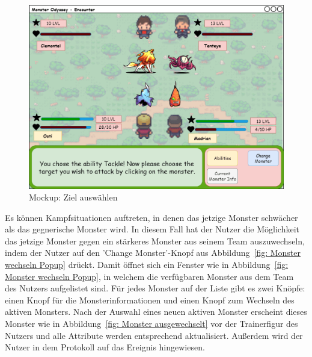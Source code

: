 \begin{figure}[H]
    \center
    \includegraphics[scale=\scale]{images/mockups/Encounter/Encounter2v2ChooseTarget.png}
    \caption{Mockup: Ziel auswählen}
    \label{fig: Ziel auswählen}
\end{figure}
Es können Kampfsituationen auftreten, in denen das jetzige Monster schwächer als das gegnerische Monster wird. 
In diesem Fall hat der Nutzer die Möglichkeit das jetzige Monster gegen ein stärkeres Monster aus seinem Team auszuwechseln, indem der Nutzer auf den 'Change Monster'-Knopf aus Abbildung~\ref{fig: Monster wechseln Popup} drückt. 
Damit öffnet sich ein Fenster wie in Abbildung~\ref{fig: Monster wechseln Popup}, in welchem die verfügbaren Monster aus dem Team des Nutzers aufgelistet sind. Für jedes Monster auf der Liste gibt es zwei Knöpfe: einen Knopf für die Monsterinformationen und einen Knopf zum Wechseln des aktiven Monsters. 
Nach der Auswahl eines neuen aktiven Monster erscheint dieses Monster wie in Abbildung~\ref{fig: Monster ausgewechselt} vor der Trainerfigur des Nutzers und alle Attribute werden entsprechend aktualisiert.
Außerdem wird der Nutzer in dem Protokoll auf das Ereignis hingewiesen. 
